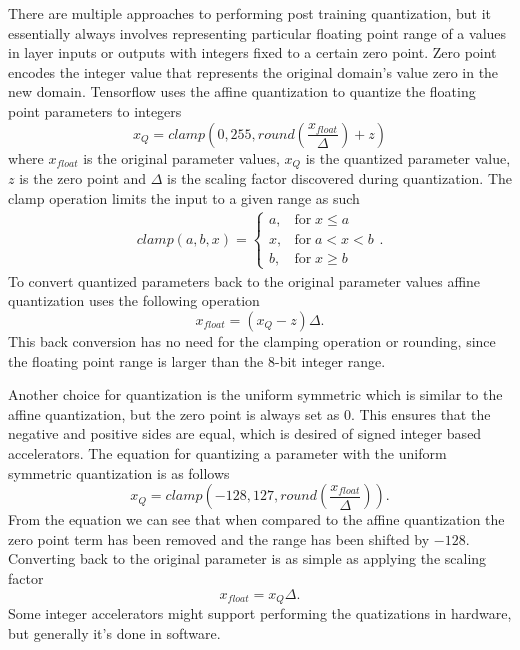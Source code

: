 \documentclass[12pt,a4paper,english
]{tunithesis}
\begin{document}
There are multiple approaches to performing post training quantization, but it essentially always involves representing particular floating point range of a values in layer inputs or outputs with integers fixed to a certain zero point. Zero point encodes the integer value that represents the original domain's value zero in the new domain. Tensorflow uses the affine quantization to quantize the floating point parameters to integers
\begin{equation}
x_{Q} = clamp(0, 255, round(\frac{x_{float}}{\Delta}) + z)
\end{equation}
where $x_{float}$ is the original parameter values, $x_{Q}$ is the quantized parameter value, $z$ is the zero point and $\Delta$ is the scaling factor discovered during quantization.
The clamp operation limits the input to a given range as such
\begin{align}
  \label{eq:clamp}
clamp(a, b, x) =
  \begin{cases}
    a, & \text{for} \; x \leq a  \\
                x, & \text{for} \; a < x < b  \\
                b, & \text{for} \; x \geq b
  \end{cases}.
\end{align}
To convert quantized parameters back to the original parameter values affine quantization uses the following operation
\begin{equation}
x_{float} = (x_{Q}-z)\Delta.
\end{equation}
This back conversion has no need for the clamping operation or rounding, since the floating point range is larger than the 8-bit integer range.

Another choice for quantization is the uniform symmetric which is similar to the affine quantization, but the zero point is always set as 0. This ensures that the negative and positive sides are equal, which is desired of signed integer based accelerators. The equation for quantizing a parameter with the uniform symmetric quantization is as follows
\begin{equation}
x_{Q} = clamp(-128, 127, round(\frac{x_{float}}{\Delta})).
\end{equation}
From the equation we can see that when compared to the affine quantization the zero point term has been removed and the range has been shifted by $-128$. Converting back to the original parameter is as simple as applying the scaling factor
\begin{equation}
x_{float} = x_{Q}\Delta.
\end{equation}
Some integer accelerators might support performing the quatizations in hardware, but generally it's done in software.
\end{document}
